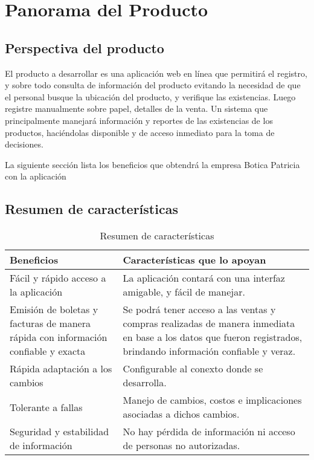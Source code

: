 \documentclass[a4paper,11pt, spanish]{report}
\begin{document}
{{{{    \section{Panorama del Producto}
      \subsection{Perspectiva del producto}
        El producto a desarrollar es una aplicación web en línea que permitirá el registro, y sobre todo consulta de información del producto evitando la necesidad de que el personal busque la ubicación del producto, y verifique las existencias. Luego registre manualmente sobre papel, detalles de la venta. Un sistema que principalmente manejará información y reportes de las existencias de los productos, haciéndolas disponible y de acceso inmediato para la toma de decisiones.

        La siguiente sección lista los beneficios que obtendrá la empresa Botica Patricia con la aplicación

      \subsection{Resumen de características}
        {\renewcommand{\arraystretch}{1.7}%
        \noindent\begin{table}[H]
        \noindent\begin{tabularx}{\textwidth}{X|X}
          \textbf {\large Beneficios} & \textbf{ \large Características que lo apoyan} \\
          \hline Fácil y rápido acceso a la aplicación & La aplicación contará con una interfaz amigable, y fácil de manejar. \\
          Emisión de boletas y facturas de manera rápida con información confiable y exacta & Se podrá tener acceso a las ventas y compras realizadas de manera inmediata en base a los datos que fueron registrados, brindando información confiable y veraz.\\
          Rápida adaptación a los cambios & Configurable al conexto donde se desarrolla. \\
          Tolerante a fallas & Manejo de cambios, costos e implicaciones asociadas a dichos cambios.\\
          Seguridad y estabilidad de información & No hay pérdida de información ni acceso de personas no autorizadas.\\
        \end{tabularx}
        \caption{Resumen de características}
        \end{table}
}}}}}
\end{document}
